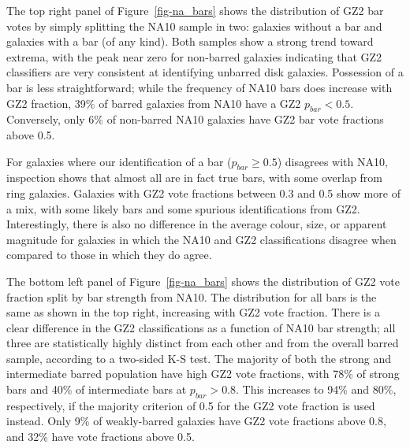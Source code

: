 \documentclass[useAMS,usenatbib]{mn2e}
\begin{document}
The top right panel of Figure~\ref{fig-na_bars} shows the distribution of GZ2 bar votes by simply splitting the NA10 sample in two: galaxies without a bar and galaxies with a bar (of any kind). Both samples show a strong trend toward extrema, with the peak near zero for non-barred galaxies indicating that GZ2 classifiers are very consistent at identifying unbarred disk galaxies. Possession of a bar is less straightforward; while the frequency of NA10 bars does increase with GZ2 fraction, 39\% of barred galaxies from NA10 have a GZ2 $p_{bar}<0.5$. Conversely, only 6\% of non-barred NA10 galaxies have GZ2 bar vote fractions above 0.5. 

For galaxies where our identification of a bar ($p_{bar}\geq0.5$) disagrees with NA10, inspection shows that almost all are in fact true bars, with some overlap from ring galaxies. Galaxies with GZ2 vote fractions between 0.3 and 0.5 show more of a mix, with some likely bars and some spurious identifications from GZ2. Interestingly, there is also no difference in the average colour, size, or apparent magnitude for galaxies in which the NA10 and GZ2 classifications disagree when compared to those in which they do agree. 



The bottom left panel of Figure~\ref{fig-na_bars} shows the distribution of GZ2 vote fraction split by bar strength from NA10. The distribution for all bars is the same as shown in the top right, increasing with GZ2 vote fraction. There is a clear difference in the GZ2 classifications as a function of NA10 bar strength; all three are statistically highly distinct from each other and from the overall barred sample, according to a two-sided K-S test. The majority of both the strong and intermediate barred population have high GZ2 vote fractions, with 78\% of strong bars and 40\% of intermediate bars at $p_{bar}>0.8$. This increases to 94\% and 80\%, respectively, if the majority criterion of 0.5 \citep{mas11c} for the GZ2 vote fraction is used instead. Only 9\% of weakly-barred galaxies have GZ2 vote fractions above 0.8, and 32\% have vote fractions above 0.5. 
\end{document}
